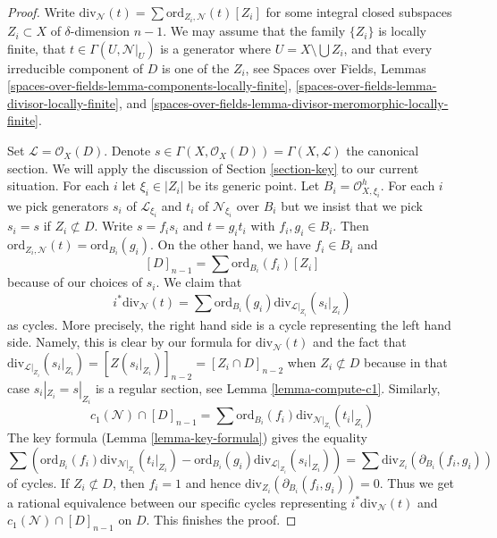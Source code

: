 \begin{proof}
Write $\text{div}_\mathcal{N}(t) = \sum \text{ord}_{Z_i, \mathcal{N}}(t)[Z_i]$
for some integral closed subspaces $Z_i \subset X$ of $\delta$-dimension
$n - 1$. We may assume that the family $\{Z_i\}$ is locally
finite, that $t \in \Gamma(U, \mathcal{N}|_U)$ is a generator
where $U = X \setminus \bigcup Z_i$, and that every irreducible component
of $D$ is one of the $Z_i$, see
Spaces over Fields, Lemmas
\ref{spaces-over-fields-lemma-components-locally-finite},
\ref{spaces-over-fields-lemma-divisor-locally-finite}, and
\ref{spaces-over-fields-lemma-divisor-meromorphic-locally-finite}.

\medskip\noindent
Set $\mathcal{L} = \mathcal{O}_X(D)$. Denote
$s \in \Gamma(X, \mathcal{O}_X(D)) = \Gamma(X, \mathcal{L})$
the canonical section. We will apply the discussion of
Section \ref{section-key} to our current situation.
For each $i$ let $\xi_i \in |Z_i|$ be its generic point. Let
$B_i = \mathcal{O}_{X, \xi_i}^h$. For each $i$ we pick generators
$s_i$ of $\mathcal{L}_{\xi_i}$ and $t_i$ of $\mathcal{N}_{\xi_i}$
over $B_i$ but we insist that we pick $s_i = s$ if $Z_i \not \subset D$.
Write $s = f_i s_i$ and $t = g_i t_i$ with $f_i, g_i \in B_i$.
Then $\text{ord}_{Z_i, \mathcal{N}}(t) = \text{ord}_{B_i}(g_i)$.
On the other hand, we have $f_i \in B_i$ and
$$
[D]_{n - 1} = \sum \text{ord}_{B_i}(f_i)[Z_i]
$$
because of our choices of $s_i$. We claim that
$$
i^*\text{div}_\mathcal{N}(t) =
\sum \text{ord}_{B_i}(g_i) \text{div}_{\mathcal{L}|_{Z_i}}(s_i|_{Z_i})
$$
as cycles. More precisely, the right hand side is a cycle
representing the left hand side. Namely, this is clear by our
formula for $\text{div}_\mathcal{N}(t)$ and the fact that
$\text{div}_{\mathcal{L}|_{Z_i}}(s_i|_{Z_i}) = [Z(s_i|_{Z_i})]_{n - 2} =
[Z_i \cap D]_{n - 2}$ when $Z_i \not \subset D$ because in
that case $s_i|_{Z_i} = s|_{Z_i}$ is a regular section, see
Lemma \ref{lemma-compute-c1}. Similarly,
$$
c_1(\mathcal{N}) \cap [D]_{n - 1} =
\sum \text{ord}_{B_i}(f_i) \text{div}_{\mathcal{N}|_{Z_i}}(t_i|_{Z_i})
$$
The key formula (Lemma \ref{lemma-key-formula}) gives the equality
$$
\sum \left(
\text{ord}_{B_i}(f_i) \text{div}_{\mathcal{N}|_{Z_i}}(t_i|_{Z_i}) -
\text{ord}_{B_i}(g_i) \text{div}_{\mathcal{L}|_{Z_i}}(s_i|_{Z_i}) \right) =
\sum \text{div}_{Z_i}(\partial_{B_i}(f_i, g_i))
$$
of cycles. If $Z_i \not \subset D$, then $f_i = 1$ and hence
$\text{div}_{Z_i}(\partial_{B_i}(f_i, g_i)) = 0$. Thus we get a rational
equivalence between our specific cycles representing
$i^*\text{div}_\mathcal{N}(t)$ and $c_1(\mathcal{N}) \cap [D]_{n - 1}$
on $D$. This finishes the proof.
\end{proof}

